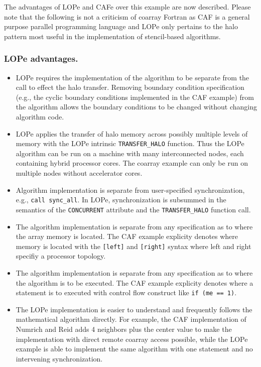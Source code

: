 The advantages of LOPe and CAFe over this example are now described.  Please note that the following
is not a criticism of coarray Fortran as CAF is a general purpose parallel programming language and
LOPe only pertains to the halo pattern most useful in the implementation of stencil-based algorithms.

\subsubsection{LOPe advantages.}
\begin{itemize}

\item
LOPe requires the implementation of the algorithm to be separate from the call to effect the halo
transfer.  Removing boundary condition specification (e.g., the cyclic boundary conditions
implemented in the CAF example) from the algorithm allows the boundary conditions to be changed
without changing algorithm code.

\item
LOPe applies the transfer of halo memory across possibly multiple levels of memory with the LOPe
intrinsic \texttt{TRANSFER\_HALO} function.  Thus the LOPe algorithm can be run on a machine with
many interconnected nodes, each containing hybrid processor cores.  The coarray example can only be
run on multiple nodes without accelerator cores.

\item
Algorithm implementation is separate from user-specified synchronization, e.g., \texttt{call
  sync\_all}.  In LOPe, synchronization is subsummed in the semantics of the \texttt{CONCURRENT}
attribute and the \texttt{TRANSFER\_HALO} function call.

\item
The algorithm implementation is separate from any specification as to where the array
memory is located.  The CAF example explicity denotes where memory is located with the
\texttt{[left]} and \texttt{[right]} syntax where left and right specifiy a processor
topology.

\item
The algorithm implementation is separate from any specification as to where the algorithm
is to be executed.  The CAF example explicity denotes where a statement is to executed
with control flow construct like \texttt{if (me == 1)}.

\item
The LOPe implementation is easier to understand and frequently follows the mathematical algorithm
directly.  For example, the CAF implementation of Numrich and Reid adds 4 neighbors plus the center
value to make the implementation with direct remote coarray access possible, while the LOPe example
is able to implement the same algorithm with one statement and no intervening synchronization.


\end{itemize}
